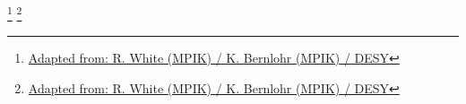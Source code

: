 \begin{frame}
  {%
  \begingroup
  \centering
  \scalebox{0.76}{}
  \endgroup
  \footnote{\href{https://www.flickr.com/photos/cta_observatory/45643242354/in/photostream/}{\textcolor{white!85!black}{Adapted from: R. White (MPIK) / K. Bernlohr (MPIK) / DESY}}}
  }
  {%
  \begingroup
  \centering
  \scalebox{0.76}{}
  \endgroup
  \footnote{\href{https://www.flickr.com/photos/cta_observatory/45643242354/in/photostream/}{\textcolor{darkgray!85!black}{Adapted from: R. White (MPIK) / K. Bernlohr (MPIK) / DESY}}}
  }
\end{frame}


